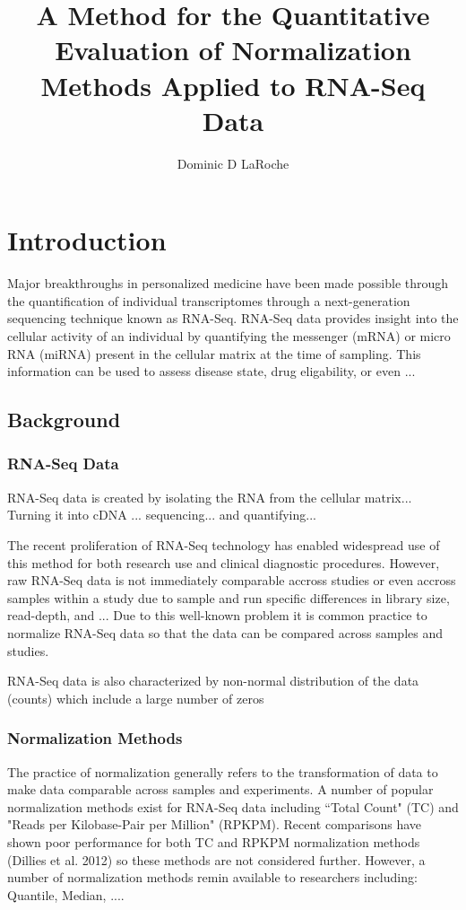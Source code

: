\documentclass{book}\usepackage[]{graphicx}\usepackage[]{color}
\title{A Method for the Quantitative Evaluation of Normalization Methods Applied to RNA-Seq Data}
\author{Dominic D LaRoche}
\begin{document}
\maketitle
\tableofcontents

\newpage

\chapter{Introduction}

Major breakthroughs in personalized medicine have been made possible through the quantification of individual transcriptomes through a next-generation sequencing technique known as RNA-Seq.  RNA-Seq data provides insight into the cellular activity of an individual by quantifying the messenger (mRNA) or micro RNA (miRNA) present in the cellular matrix at the time of sampling.  This information can be used to assess disease state, drug eligability, or even ...




\section{Background}
\subsection{RNA-Seq Data}

RNA-Seq data is created by isolating the RNA from the cellular matrix... Turning it into cDNA ... sequencing... and quantifying...

The recent proliferation of RNA-Seq technology has enabled widespread use of this method for both research use and clinical diagnostic procedures.  However, raw RNA-Seq data is not immediately comparable accross studies or even accross samples within a study due to sample and run specific differences in library size, read-depth, and ...  Due to this well-known problem it is common practice to normalize RNA-Seq data so that the data can be compared across samples and studies.  

RNA-Seq data is also characterized by non-normal distribution of the data (counts) which include a large number of zeros 
 

\subsection{Normalization Methods}

The practice of normalization generally refers to the transformation of data to make data comparable across samples and experiments.  A number of popular normalization methods exist for RNA-Seq data including ``Total Count" (TC) and "Reads per Kilobase-Pair per Million" (RPKPM).  Recent comparisons have shown poor performance for both TC and RPKPM normalization methods (Dillies et al. 2012) so these methods are not considered further.  However, a number of normalization methods remin available to researchers including: Quantile, Median, ....  
\end{document}
